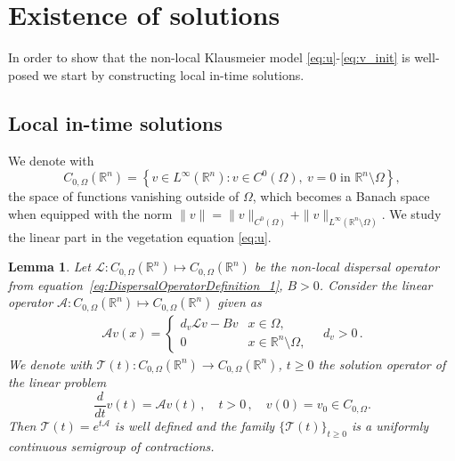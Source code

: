 \documentclass[11pt, a4paper]{article}
\theoremstyle{break}
\theoremstyle{break}
\theoremstyle{break}
\theoremstyle{break}
\theoremstyle{break}
\newtheorem{lem}{Lemma}[section]
\theoremstyle{break}
\theoremstyle{break}
\theoremstyle{break}
\theoremstyle{break}
\begin{document}
\section{Existence of solutions}
In order to show that the non-local Klausmeier model \eqref{eq:u}-\eqref{eq:v_init} is well-posed we start by constructing local in-time solutions. 

\subsection{Local in-time solutions} 
We denote with 
\begin{equation}
    \label{EQ:C_0_OMEGA}
    C_{0, \Omega}(\mathbb{R}^n) = \left\{ v \in L^\infty(\mathbb{R}^n): v \in C^0(\Omega), \: v = 0 \text{ in } \mathbb{R}^n \setminus \Omega \right\},
\end{equation}
the space of functions vanishing outside of $\Omega$, which becomes a Banach space when equipped with the norm $\|v\|= \|v\|_{C^0(\Omega)} + \|v\|_{L^\infty(\mathbb{R}^n\setminus \Omega)}$. We study the linear part in the vegetation equation \eqref{eq:u}.  

\begin{lem} Let $\mathcal{L}:  C_{0, \Omega}(\mathbb{R}^n) \mapsto C_{0, \Omega}(\mathbb{R}^n)$ be the non-local dispersal operator from equation~\ref{eq:DispersalOperatorDefinition_1}, $B>0$.
Consider the linear operator $\mathcal{A}: C_{0, \Omega}(\mathbb{R}^n) \mapsto C_{0, \Omega}(\mathbb{R}^n)$ given as
\begin{align}
    \label{EQ:A_OPERATOR_DEFINITION}
    \mathcal{A} v (x) =
    \begin{cases}
        d_v\mathcal{L}v - Bv &x \in \Omega, \\
        0 &x \in \mathbb{R}^n \setminus \Omega,
    \end{cases} \quad d_v >0 \,.
\end{align} 
We denote with $\mathcal{T}(t) : C_{0, \Omega} (\mathbb{R}^n) \to  C_{0, \Omega} (\mathbb{R}^n)$, $ t \geq 0$ the solution operator of the linear problem 
    \begin{equation}
        \label{eq:v_semilinear_problem}
        \frac{d}{dt} v(t) = \mathcal{A} v (t) \,, \quad t > 0 \,, \quad  v(0) = v_0 \in C_{0, \Omega}.
    \end{equation}
    Then $\mathcal{T}(t) = e^{t\mathcal{A}}$ is well defined and the family $\{\mathcal{T}(t)\}_{t \geq 0}$ is a uniformly continuous semigroup of contractions.
    \label{lem:A_SEMIGROUP_GENERATOR}
\end{lem}
\end{document}
